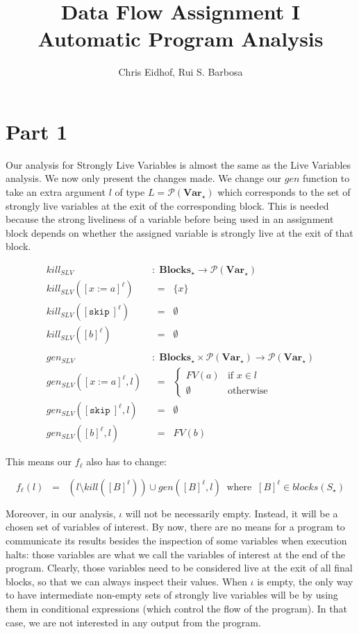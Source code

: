 \documentclass[a4wide,12pt]{article}
\def\eq{\;\; = \;\;}
\def\pset#1{\mathcal{P}(#1)}
\def\Blocks{\mathbf{Blocks}}
\def\Var {\mathbf{Var}}
\def\skip {\texttt{skip}\ }
\begin{document}
\author{Chris Eidhof, Rui S. Barbosa}
\title{Data Flow Assignment I \\ Automatic Program Analysis}
 
\maketitle
 
\section{Part 1}
 
Our analysis for Strongly Live Variables is almost the same as the Live
Variables analysis. We now only present the changes made. We
change our $gen$ function to take an extra argument $l$ of type $L = \pset{\Var_\star}$ which
corresponds to the set of strongly live variables at the exit of the corresponding block.
This is needed because the strong liveliness of a variable before
being used in an assignment block
depends on whether the assigned variable is strongly live at the exit of that block.
 
\begin{align*}
kill_{SLV} & \; : \; \Blocks_\star \to \pset{\Var_\star} \\
kill_{SLV}([x:=a]^\ell) & \eq \{x\} \\
kill_{SLV}([\skip]^\ell) & \eq \emptyset\\
kill_{SLV}([b]^\ell) & \eq \emptyset \\
\\
gen_{SLV} & \; : \; \Blocks_\star \times \pset{\Var_\star} \to \pset{\Var_\star} \\
gen_{SLV}([x:=a]^\ell,l) & \eq
         \begin{cases}
          FV(a) & \text{if $x \in l$} \\
          \emptyset & \text{otherwise}
         \end{cases} \\
gen_{SLV}([\skip]^\ell,l) & \eq \emptyset\\
gen_{SLV}([b]^\ell,l) & \eq FV(b)
\end{align*}
 
This means our $f_\ell$ also has to change:
 
\[ f_\ell(l) \eq (l \setminus kill([B]^\ell)) \cup gen([B]^\ell, l) \;\; \text{where} \;\; [B]^\ell
\in blocks(S_\star)
\]
 
Moreover, in our analysis, $\iota$ will not be necessarily empty. Instead, it will be a chosen set of
variables of interest.
By now, there are no means for a program
to communicate its results besides the inspection of some variables when execution halts: those variables
are what we call the variables of interest at the end of the program. Clearly,
those variables need to be considered live at the exit of all final blocks, so that we can always inspect their values.
When $\iota$ is empty, the only way to have intermediate
non-empty sets of strongly live variables will be by using them in conditional expressions (which control the
flow of the program). In that case, we are not interested in any output from the program.
 
\end{document}
